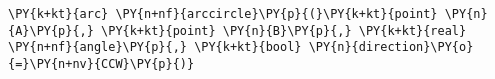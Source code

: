 \begin{Verbatim}[commandchars=\\\{\}]
    \PY{k+kt}{arc} \PY{n+nf}{arccircle}\PY{p}{(}\PY{k+kt}{point} \PY{n}{A}\PY{p}{,} \PY{k+kt}{point} \PY{n}{B}\PY{p}{,} \PY{k+kt}{real} \PY{n+nf}{angle}\PY{p}{,} \PY{k+kt}{bool} \PY{n}{direction}\PY{o}{=}\PY{n+nv}{CCW}\PY{p}{)}
\end{Verbatim}
